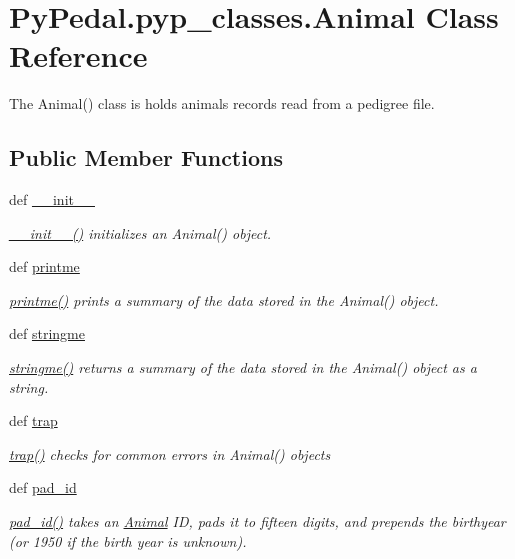 \hypertarget{classPyPedal_1_1pyp__classes_1_1Animal}{
\section{PyPedal.pyp\_\-classes.Animal Class Reference}
\label{classPyPedal_1_1pyp__classes_1_1Animal}
}


The Animal() class is holds animals records read from a pedigree file.  


\subsection*{Public Member Functions}
\begin{DoxyCompactItemize}
\item 
def \hyperlink{classPyPedal_1_1pyp__classes_1_1Animal_a70faad62bca4ba5416716e9e80ac1f4b}{\_\-\_\-init\_\-\_\-}
\begin{DoxyCompactList}\small\item\em \hyperlink{classPyPedal_1_1pyp__classes_1_1Animal_a70faad62bca4ba5416716e9e80ac1f4b}{\_\-\_\-init\_\-\_\-()} initializes an Animal() object. \end{DoxyCompactList}\item 
def \hyperlink{classPyPedal_1_1pyp__classes_1_1Animal_af51068dab30eb24722552cf6bb41c287}{printme}
\begin{DoxyCompactList}\small\item\em \hyperlink{classPyPedal_1_1pyp__classes_1_1Animal_af51068dab30eb24722552cf6bb41c287}{printme()} prints a summary of the data stored in the Animal() object. \end{DoxyCompactList}\item 
def \hyperlink{classPyPedal_1_1pyp__classes_1_1Animal_ac3daf931dff355bfae652a95b41d0503}{stringme}
\begin{DoxyCompactList}\small\item\em \hyperlink{classPyPedal_1_1pyp__classes_1_1Animal_ac3daf931dff355bfae652a95b41d0503}{stringme()} returns a summary of the data stored in the Animal() object as a string. \end{DoxyCompactList}\item 
def \hyperlink{classPyPedal_1_1pyp__classes_1_1Animal_addb9409a4949f8317cf69313bbd0bd91}{trap}
\begin{DoxyCompactList}\small\item\em \hyperlink{classPyPedal_1_1pyp__classes_1_1Animal_addb9409a4949f8317cf69313bbd0bd91}{trap()} checks for common errors in Animal() objects \end{DoxyCompactList}\item 
def \hyperlink{classPyPedal_1_1pyp__classes_1_1Animal_a41d6af83aa24c442fd52005cb45bd2fd}{pad\_\-id}
\begin{DoxyCompactList}\small\item\em \hyperlink{classPyPedal_1_1pyp__classes_1_1Animal_a41d6af83aa24c442fd52005cb45bd2fd}{pad\_\-id()} takes an \hyperlink{classPyPedal_1_1pyp__classes_1_1Animal}{Animal} ID, pads it to fifteen digits, and prepends the birthyear (or 1950 if the birth year is unknown). \end{DoxyCompactList}\end{DoxyCompactItemize}
